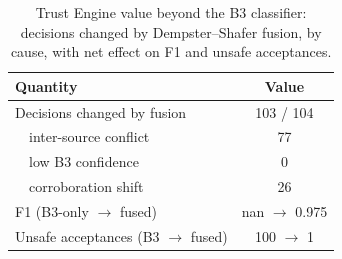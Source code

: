 \begin{table}[t]
\centering
\caption{Trust Engine value beyond the B3 classifier: decisions changed by Dempster--Shafer fusion, by cause, with net effect on F1 and unsafe acceptances.}
\label{tab:fusion}
\begin{tabular}{lc}
\toprule
Quantity & Value \\
\midrule
Decisions changed by fusion & 103 / 104 \\
\ \ inter-source conflict & 77 \\
\ \ low B3 confidence & 0 \\
\ \ corroboration shift & 26 \\
F1 (B3-only $\to$ fused) & nan $\to$ 0.975 \\
Unsafe acceptances (B3 $\to$ fused) & 100 $\to$ 1 \\
\bottomrule
\end{tabular}
\end{table}
